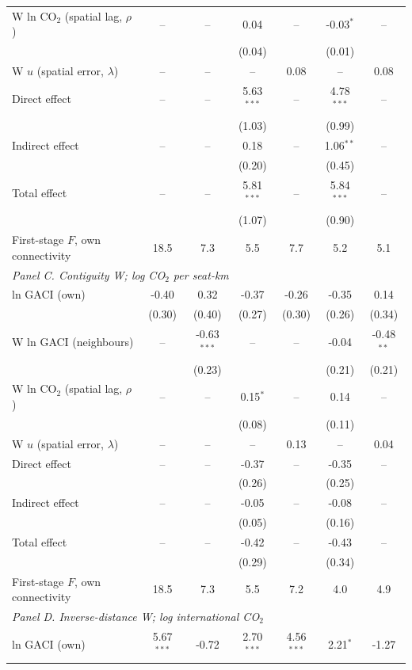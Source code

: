 \documentclass[12pt]{article}
\begin{document}
\begin{table}[H]
{\begin{threeparttable}
\begin{tabular}{lcccccc}
  W ln CO$_2$ (spatial lag, $\rho$) & -- & -- & 0.04 & -- & -0.03$^{*}$ & -- \\
   &  &  & (0.04) &  & (0.01) &  \\
  W $u$ (spatial error, $\lambda$) & -- & -- & -- & 0.08 & -- & 0.08 \\
  Direct effect & -- & -- & 5.63$^{***}$ & -- & 4.78$^{***}$ & -- \\
   &  &  & (1.03) &  & (0.99) &  \\
  Indirect effect & -- & -- & 0.18 & -- & 1.06$^{**}$ & -- \\
   &  &  & (0.20) &  & (0.45) &  \\
  Total effect & -- & -- & 5.81$^{***}$ & -- & 5.84$^{***}$ & -- \\
   &  &  & (1.07) &  & (0.90) &  \\
  First-stage $F$, own connectivity & 18.5 & 7.3 & 5.5 & 7.7 & 5.2 & 5.1 \\
\midrule
\multicolumn{7}{l}{\textit{Panel C. Contiguity W; log CO$_2$ per seat-km}} \\
  ln GACI (own) & -0.40 & 0.32 & -0.37 & -0.26 & -0.35 & 0.14 \\
   & (0.30) & (0.40) & (0.27) & (0.30) & (0.26) & (0.34) \\
  W ln GACI (neighbours) & -- & -0.63$^{***}$ & -- & -- & -0.04 & -0.48$^{**}$ \\
   &  & (0.23) &  &  & (0.21) & (0.21) \\
  W ln CO$_2$ (spatial lag, $\rho$) & -- & -- & 0.15$^{*}$ & -- & 0.14 & -- \\
   &  &  & (0.08) &  & (0.11) &  \\
  W $u$ (spatial error, $\lambda$) & -- & -- & -- & 0.13 & -- & 0.04 \\
  Direct effect & -- & -- & -0.37 & -- & -0.35 & -- \\
   &  &  & (0.26) &  & (0.25) &  \\
  Indirect effect & -- & -- & -0.05 & -- & -0.08 & -- \\
   &  &  & (0.05) &  & (0.16) &  \\
  Total effect & -- & -- & -0.42 & -- & -0.43 & -- \\
   &  &  & (0.29) &  & (0.34) &  \\
  First-stage $F$, own connectivity & 18.5 & 7.3 & 5.5 & 7.2 & 4.0 & 4.9 \\
\midrule
\multicolumn{7}{l}{\textit{Panel D. Inverse-distance W; log international CO$_2$}} \\
  ln GACI (own) & 5.67$^{***}$ & -0.72 & 2.70$^{***}$ & 4.56$^{***}$ & 2.21$^{*}$ & -1.27 \\

\end{tabular}
\end{threeparttable}}
\end{table}
\end{document}

